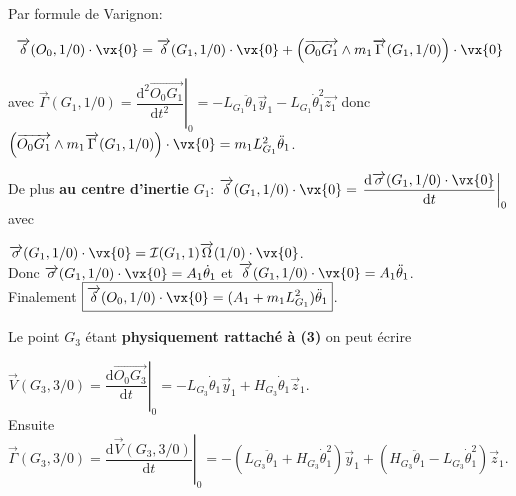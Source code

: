 \ifprof
\begin{corrige}
Par formule de Varignon:

$$ \overrightarrow{\delta}(O_0,1/0)\cdot \vx{0} = \overrightarrow{\delta}(G_1,1/0)\cdot \vx{0} + \left( \overrightarrow{O_0 G_1} \wedge m_1 \overrightarrow{\Gamma}(G_1,1/0) \right)\cdot \vx{0} $$

avec $\overrightarrow{\Gamma}(G_1,1/0) = \left. \dfrac{\mathrm{d}^2\overrightarrow{O_0 G_1}}{\mathrm{d}t^2} \right|_0 = -L_{G_1}\ddot{\theta}_1 \overrightarrow{y}_1 -L_{G_1}\dot{\theta}_1^2\overrightarrow{z_1}$ donc $\left( \overrightarrow{O_0 G_1} \wedge m_1 \overrightarrow{\Gamma}(G_1,1/0) \right)\cdot \vx{0} = m_1 L_{G_1}^2\ddot{\theta}_1$.

De plus \textbf{au centre d'inertie} $G_1$: $\overrightarrow{\delta}(G_1,1/0)\cdot \vx{0} = \left. \dfrac{\mathrm{d}\overrightarrow{\sigma}(G_1,1/0)\cdot \vx{0}}{\mathrm{d}t} \right|_0$ avec 

$\overrightarrow{\sigma}(G_1,1/0)\cdot \vx{0} = \mathcal{I}(G_1,1)\overrightarrow{\Omega}(1/0)\cdot \vx{0}$.\\

Donc $\overrightarrow{\sigma}(G_1,1/0)\cdot \vx{0} = A_1 \dot{\theta}_1$ et $\overrightarrow{\delta}(G_1,1/0)\cdot \vx{0} = A_1 \ddot{\theta}_1$.\\

Finalement $\boxed{\overrightarrow{\delta}(O_0,1/0)\cdot \vx{0} = (A_1 + m_1 L_{G_1}^2)\ddot{\theta}_1}$.

\end{corrige}
\else
\fi

\ifprof
\begin{corrige}
Le point $G_3$ étant \textbf{physiquement rattaché à (3)} on peut écrire 

$\boxed{\overrightarrow{V}(G_3,3/0) = \left. \dfrac{\mathrm{d}\overrightarrow{O_0 G_3}}{\mathrm{d}t} \right|_0 = -L_{G_3}\dot{\theta}_1\overrightarrow{y}_1 + H_{G_3}\dot{\theta}_1\overrightarrow{z}_1}$.\\

Ensuite $\boxed{\overrightarrow{\Gamma}(G_3,3/0) = \left. \dfrac{\mathrm{d}\overrightarrow{V}(G_3,3/0)}{\mathrm{d}t} \right|_0 = -\left(L_{G_3}\ddot{\theta}_1 + H_{G_3}\dot{\theta}_1^2\right)\overrightarrow{y}_1 + \left(H_{G_3}\ddot{\theta}_1 - L_{G_3}\dot{\theta}_1^2\right)\overrightarrow{z}_1}$.

\end{corrige}
\else
\fi


